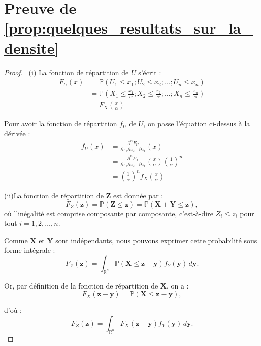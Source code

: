 \documentclass[a4paper,10pt]{article}
\theoremstyle{definition} %
\theoremstyle{definition} %
\theoremstyle{definition} %
\theoremstyle{definition} %
\begin{document}
\section{Preuve de \cref{prop:quelques_resultats_sur_la_densite}} \label{sec:proof_quelques_resultates_sur_la_densite}
\begin{proof}\
    (i) La fonction de répartition de $U$ s'écrit :
    \begin{align*}
        F_U(x) &= \mathbb{P}(U_1 \leq x_1;U_2 \leq x_2;\dots;U_n \leq x_n) \\
        &=\mathbb{P}\left(X_1 \leq \frac{x_1}{ \alpha};X_2 \leq \frac{x_2}{\alpha};\dots;X_n \leq \frac{x_n}{ \alpha}\right) \\
        &= F_X\left(\frac{x}{\alpha}\right)
    \end{align*}

    Pour avoir la fonction de répartition $f_U$ de $U$, on passe l'équation ci-dessus à la dérivée :
    \begin{align*}
        f_U(x) &= \frac{\partial^nF_U}{\partial z_1 \partial z_2 \dots\partial z_1}(x) \\
        &= \frac{\partial^nF_X}{\partial z_1 \partial z_2 \dots\partial z_1}\left(\frac{x}{ \alpha}\right) \left(\frac{1}{ \alpha}\right)^n \\
        &=\left(\frac{1}{ \alpha}\right)^n f_X\left(\frac{x}{\alpha}\right)
    \end{align*}

    (ii)La fonction de répartition de \( \mathbf{Z} \) est donnée par :
    \[
    F_Z(\mathbf{z}) = \mathbb{P}(\mathbf{Z} \leq \mathbf{z}) = \mathbb{P}(\mathbf{X} + \mathbf{Y} \leq \mathbf{z}),
    \]
    où l'inégalité est comprise composante par composante, c'est-à-dire \( Z_i \leq z_i \) pour tout \( i = 1,2, \dots, n \).
    
    Comme \( \mathbf{X} \) et \( \mathbf{Y} \) sont indépendants, nous pouvons exprimer cette probabilité sous forme intégrale :
    \[
    F_Z(\mathbf{z}) = \int_{\mathbb{R}^n} \mathbb{P}(\mathbf{X} \leq \mathbf{z} - \mathbf{y}) f_Y(\mathbf{y}) \, d\mathbf{y}.
    \]
    
    Or, par définition de la fonction de répartition de \( \mathbf{X} \), on a :
    \[
    F_X(\mathbf{z} - \mathbf{y}) = \mathbb{P}(\mathbf{X} \leq \mathbf{z} - \mathbf{y}),
    \]
    
    d'où :
    \[
    F_Z(\mathbf{z}) = \int_{\mathbb{R}^n} F_X(\mathbf{z} - \mathbf{y}) f_Y(\mathbf{y}) \, d\mathbf{y}.
    \]
    

\end{proof}
\end{document}
